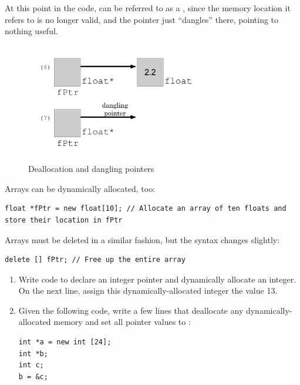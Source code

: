 At this point in the code,  can be referred to as a , since the memory location it refers to is no longer valid, and the pointer just ``dangles'' there, pointing to nothing useful. 

\begin{figure}[tbh]
  \centering
  \includegraphics[width=0.7\textwidth]{diagrams/new_operator_diagram_3.pdf}
  \caption{Deallocation and dangling pointers} \label{fig:new_operator_diagram_3} 
\end{figure}
\noindent Arrays can be dynamically allocated, too:

\noindent\begin{minipage}{\linewidth}\begin{lstlisting}
float *fPtr = new float[10]; // Allocate an array of ten floats and store their location in fPtr
\end{lstlisting}\end{minipage}

\noindent Arrays must be deleted in a similar fashion, but the syntax changes slightly:

\noindent\begin{minipage}{\linewidth}\begin{lstlisting}
delete [] fPtr; // Free up the entire array
\end{lstlisting}\end{minipage}



\begin{enumerate}
	\item Write code to declare an integer pointer and dynamically allocate an integer. On the next line, assign this dynamically-allocated integer the value 13.

  \item Given the following code, write a few lines that deallocate any dynamically-allocated memory and set all pointer values to :

\noindent\begin{minipage}{\linewidth}\begin{lstlisting}
int *a = new int [24];
int *b;
int c;
b = &c;
\end{lstlisting}\end{minipage}


\end{enumerate}

